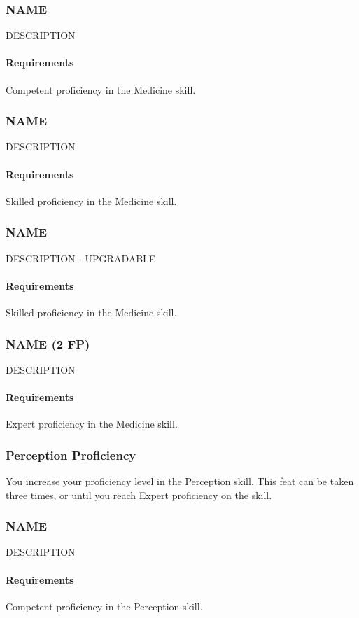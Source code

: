 \subsubsection{NAME} \label{feat::name}
    DESCRIPTION
    \paragraph{Requirements} Competent proficiency in the Medicine skill.
\subsubsection{NAME} \label{feat::name}
    DESCRIPTION
    \paragraph{Requirements} Skilled proficiency in the Medicine skill.
\subsubsection{NAME} \label{feat::name}
    DESCRIPTION - UPGRADABLE
    \paragraph{Requirements} Skilled proficiency in the Medicine skill.
\subsubsection{NAME (2 FP)} \label{feat::name}
    DESCRIPTION
    \paragraph{Requirements} Expert proficiency in the Medicine skill.
\subsubsection{Perception Proficiency} \label{feat::perceptionprof}
    You increase your proficiency level in the Perception skill.
    This feat can be taken three times, or until you reach Expert proficiency on the skill.
\subsubsection{NAME} \label{feat::name}
    DESCRIPTION
    \paragraph{Requirements} Competent proficiency in the Perception skill.
